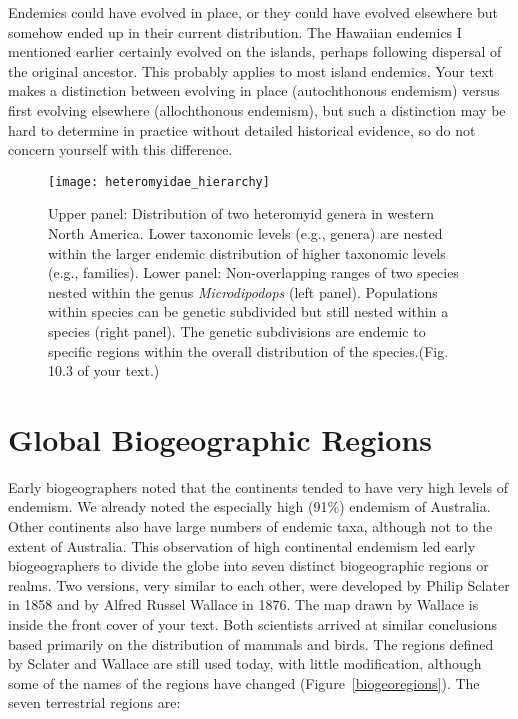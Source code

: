 \documentclass[11pt, hidelinks]{article}
\begin{document}
Endemics could have evolved in place, or they could have evolved elsewhere but somehow ended up in their current distribution.  The Hawaiian endemics I mentioned earlier certainly evolved on the islands, perhaps following dispersal of the original ancestor.  This probably applies to most island endemics.  Your text makes a distinction between evolving in place (autochthonous endemism) versus first evolving elsewhere (allochthonous endemism), but such a distinction may be hard to determine in practice without detailed historical evidence, so do not concern yourself with this difference.

\begin{figure}[tbp]
	\centering
		\texttt{[image: heteromyidae\_hierarchy]}
		\caption{Upper panel: Distribution of two heteromyid genera in western North America. Lower taxonomic levels (e.g., genera) are nested within the larger endemic distribution of higher taxonomic levels (e.g., families). Lower panel: Non-overlapping ranges of two species nested within the genus \emph{Microdipodops} (left panel). Populations within species can be genetic subdivided but still nested within a species (right panel). The genetic subdivisions are endemic to specific regions within the overall distribution of the species.(Fig. 10.3 of your text.)\label{heteroEndemism}}
		
\end{figure}


\section{Global Biogeographic Regions}

Early biogeographers noted that the continents tended to have very high levels of endemism.  We already noted the especially high (91\%) endemism of Australia.  Other continents also have large numbers of endemic taxa, although not to the extent of Australia.  This observation of high continental endemism led early biogeographers to divide the globe into seven distinct biogeographic regions or realms.  Two versions, very similar to each other, were developed by Philip Sclater in 1858 and by Alfred Russel Wallace in 1876. The map drawn by Wallace is inside the front cover of your text. Both scientists arrived at similar conclusions based primarily on the distribution of mammals and birds. The regions defined by Sclater and Wallace are still used today, with little modification, although some of the names of the regions have changed (Figure~\ref{biogeoregions}).  The seven terrestrial regions are: 
\end{document}

